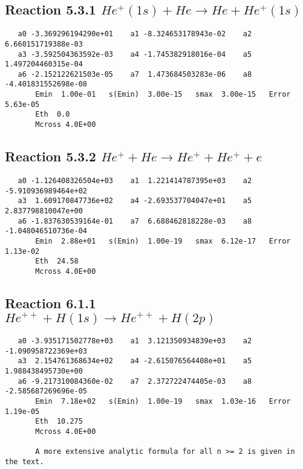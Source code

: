 \documentclass[12pt,dvipdfmx]{article}
\begin{document}
\newpage
\subsection{
Reaction 5.3.1 $   He^+(1s) + He \rightarrow He + He^+(1s)$}


\begin{small}\begin{verbatim}
   a0 -3.369296194290e+01    a1 -8.324653178943e-02    a2  6.660151719388e-03
   a3 -3.592504363592e-03    a4 -1.745382918016e-04    a5  1.497204460315e-04
   a6 -2.152122621503e-05    a7  1.473684503283e-06    a8 -4.401831552698e-08
       Emin  1.00e-01   s(Emin)  3.00e-15   smax  3.00e-15   Error  5.63e-05
       Eth  0.0
       Mcross 4.0E+00
\end{verbatim}\end{small}






\newpage
\subsection{
Reaction 5.3.2 $   He^+ + He \rightarrow He^+ + He^+ + e$}


\begin{small}\begin{verbatim}
   a0 -1.126408326504e+03    a1  1.221414787395e+03    a2 -5.910936989464e+02
   a3  1.609170847736e+02    a4 -2.693537704047e+01    a5  2.837798810047e+00
   a6 -1.837630539164e-01    a7  6.688462818228e-03    a8 -1.048046510736e-04
       Emin  2.88e+01   s(Emin)  1.00e-19   smax  6.12e-17   Error  1.13e-02
       Eth  24.58
       Mcross 4.0E+00
\end{verbatim}\end{small}

\newpage
\subsection{
Reaction 6.1.1 $   He^{++} + H(1s) \rightarrow He^{++} + H(2p)$}


\begin{small}\begin{verbatim}
   a0 -3.935171502778e+03    a1  3.121350934839e+03    a2 -1.090958722369e+03
   a3  2.154761368634e+02    a4 -2.615076564408e+01    a5  1.988438495730e+00
   a6 -9.217310084360e-02    a7  2.372722474405e-03    a8 -2.585687269696e-05
       Emin  7.18e+02   s(Emin)  1.00e-19   smax  1.03e-16   Error  1.19e-05
       Eth  10.275
       Mcross 4.0E+00

       A more extensive analytic formula for all n >= 2 is given in the text.
\end{verbatim}\end{small}
\end{document}
